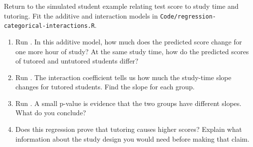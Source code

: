 \begin{exercise}
Return to the simulated student example relating test score to study time and
tutoring. Fit the additive and interaction models in
\lstinline{Code/regression-categorical-interactions.R}.
\begin{enumerate}
  \item Run . In this additive model, how much does the
    predicted score change for one more hour of study? At the same study time,
    how do the predicted scores of tutored and untutored students differ?
  \item Run . The interaction coefficient
    tells us how much the study-time slope changes for tutored students. Find
    the slope for each group.
  \item Run . A small p-value is
    evidence that the two groups have different slopes. What do you conclude?
  \item Does this regression prove that tutoring causes higher scores? Explain
    what information about the study design you would need before making that
    claim.
\end{enumerate}
\end{exercise}

